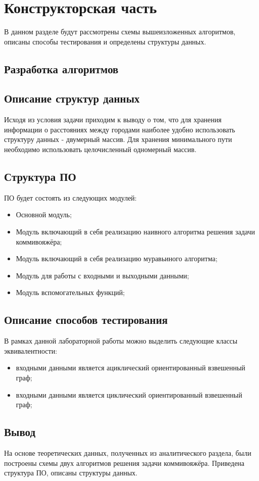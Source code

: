 \chapter{Конструкторская часть}
В данном разделе будут рассмотрены схемы вышеизложенных алгоритмов, описаны способы тестирования и определены структуры данных. 
\section{Разработка алгоритмов}



\clearpage
{}


\section{Описание структур данных}
Исходя из условия задачи приходим к выводу о том, что для хранения информации о расстояниях между городами наиболее удобно использовать структуру данных - двумерный массив. Для хранения минимального пути необходимо использовать целочисленный одномерный массив.
  

\section{Структура ПО}
ПО будет состоять из следующих модулей:

\begin{itemize}
    \item Основной модуль;
    \item Модуль включающий в себя реализацию наивного алгоритма решения задачи коммивояжёра;
    \item Модуль включающий в себя реализацию муравьиного алгоритма;
    \item Модуль для работы с входными и выходными данными;
    \item Модуль вспомогательных функций;
\end{itemize}

\section{Описание способов тестирования}
В рамках данной лабораторной работы можно выделить следующие классы эквивалентности:
\begin{itemize}
    \item входными данными является ациклический ориентированный взвешенный граф;
    \item входными данными является циклический ориентированный взвешенный граф;
\end{itemize}

\section*{Вывод}

На основе теоретических данных, полученных из аналитического раздела, были построены схемы двух алгоритмов решения задачи коммивояжёра. Приведена структура ПО, описаны структуры данных.